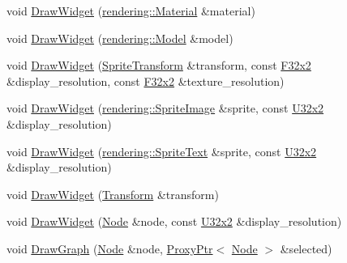 \begin{DoxyCompactItemize}
\item 
void \mbox{\hyperlink{namespacemage_1_1script_1_1anonymous__namespace_02editor__script_8cpp_03_a5e0761853945b8519c6b8f39b888420a}{Draw\+Widget}} (\mbox{\hyperlink{classmage_1_1rendering_1_1_material}{rendering\+::\+Material}} \&material)
\item 
void \mbox{\hyperlink{namespacemage_1_1script_1_1anonymous__namespace_02editor__script_8cpp_03_a92235da8a7035a003232bf76ec407859}{Draw\+Widget}} (\mbox{\hyperlink{classmage_1_1rendering_1_1_model}{rendering\+::\+Model}} \&model)
\item 
void \mbox{\hyperlink{namespacemage_1_1script_1_1anonymous__namespace_02editor__script_8cpp_03_a6aee357e49d8ad3eaa7b14f3de668aac}{Draw\+Widget}} (\mbox{\hyperlink{classmage_1_1_sprite_transform}{Sprite\+Transform}} \&transform, const \mbox{\hyperlink{namespacemage_aee4759dedc8def6c6dec26b5c7eddf29}{F32x2}} \&display\+\_\+resolution, const \mbox{\hyperlink{namespacemage_aee4759dedc8def6c6dec26b5c7eddf29}{F32x2}} \&texture\+\_\+resolution)
\item 
void \mbox{\hyperlink{namespacemage_1_1script_1_1anonymous__namespace_02editor__script_8cpp_03_aa6702e2ff1562afadf04c8388556234d}{Draw\+Widget}} (\mbox{\hyperlink{classmage_1_1rendering_1_1_sprite_image}{rendering\+::\+Sprite\+Image}} \&sprite, const \mbox{\hyperlink{namespacemage_ae5e7ccf8a1785baaacf57b3a0f4324e2}{U32x2}} \&display\+\_\+resolution)
\item 
void \mbox{\hyperlink{namespacemage_1_1script_1_1anonymous__namespace_02editor__script_8cpp_03_a0912159675030c89ea49f8d96579e0f6}{Draw\+Widget}} (\mbox{\hyperlink{classmage_1_1rendering_1_1_sprite_text}{rendering\+::\+Sprite\+Text}} \&sprite, const \mbox{\hyperlink{namespacemage_ae5e7ccf8a1785baaacf57b3a0f4324e2}{U32x2}} \&display\+\_\+resolution)
\item 
void \mbox{\hyperlink{namespacemage_1_1script_1_1anonymous__namespace_02editor__script_8cpp_03_ac4b2588b097f97cf3d9bf6bbec7938ba}{Draw\+Widget}} (\mbox{\hyperlink{classmage_1_1_transform}{Transform}} \&transform)
\item 
void \mbox{\hyperlink{namespacemage_1_1script_1_1anonymous__namespace_02editor__script_8cpp_03_aa6f57f0880bb438f22ff63bde8522518}{Draw\+Widget}} (\mbox{\hyperlink{classmage_1_1_node}{Node}} \&node, const \mbox{\hyperlink{namespacemage_ae5e7ccf8a1785baaacf57b3a0f4324e2}{U32x2}} \&display\+\_\+resolution)
\item 
void \mbox{\hyperlink{namespacemage_1_1script_1_1anonymous__namespace_02editor__script_8cpp_03_a0e1c1d61b369a6c6eee68380890d5217}{Draw\+Graph}} (\mbox{\hyperlink{classmage_1_1_node}{Node}} \&node, \mbox{\hyperlink{classmage_1_1_proxy_ptr}{Proxy\+Ptr}}$<$ \mbox{\hyperlink{classmage_1_1_node}{Node}} $>$ \&selected)

\end{DoxyCompactItemize}

